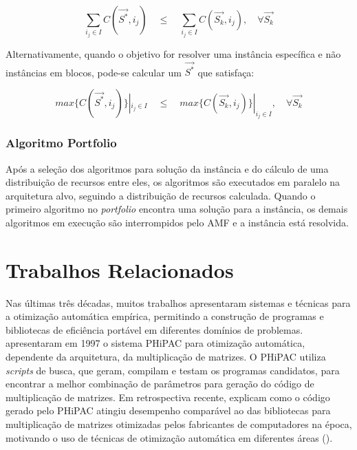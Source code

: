 \documentclass[a4paper, 12pt]{article}
\begin{document}
\begin{equation*}
\sum_{i_j \in I} C(\overrightarrow{S^*},i_j) \quad \leq \quad \sum_{i_j \in I}
C(\overrightarrow{S_k}, i_j), \quad \forall \overrightarrow{S_k}
\end{equation*}

Alternativamente, quando o objetivo for resolver uma instância específica e
não instâncias em blocos, pode-se calcular um $\overrightarrow{S^*}$ que
satisfaça:

\begin{equation*}
    max \{C(\overrightarrow{S^*},i_j)\} |_{i_j \in I} \quad \leq \quad
    max \{C(\overrightarrow{S_k}, i_j)\} |_{i_j \in I}, \quad \forall
    \overrightarrow{S_k}
\end{equation*}

\subsubsection{Algoritmo Portfolio} \label{sec:portfolio}

Após a seleção dos algoritmos para solução da instância e do
cálculo de uma distribuição de recursos entre eles, os algoritmos
são executados em paralelo na arquitetura alvo, seguindo a distribuição
de recursos calculada. Quando o primeiro algoritmo no \emph{portfolio}
encontra uma solução para a instância, os demais algoritmos em execução
são interrompidos pelo AMF e a instância está resolvida.

\section{Trabalhos Relacionados} \label{sec:trabrel}

Nas últimas três décadas, muitos trabalhos apresentaram sistemas e técnicas
para a otimização automática empírica, permitindo a construção de programas e
bibliotecas de eficiência portável em diferentes domínios de problemas.
\citet{bilmes1997} apresentaram em 1997 o sistema PHiPAC para otimização
automática, dependente da arquitetura, da multiplicação de matrizes. O PHiPAC
utiliza \emph{scripts} de busca, que geram, compilam e testam os programas
candidatos, para encontrar a melhor combinação de parâmetros para geração do
código de multiplicação de matrizes. Em retrospectiva recente,
\citet{bilmes2014phipacretro} explicam como o código gerado pelo PHiPAC atingiu
desempenho comparável ao das bibliotecas para multiplicação de matrizes
otimizadas pelos fabricantes de computadores na época, motivando o uso de
técnicas de otimização automática em diferentes áreas
(\citet{demmel2009accelerating}).
\end{document}
